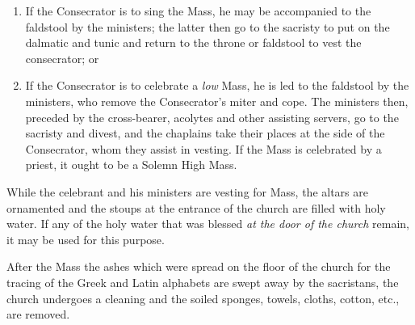 \documentclass[letterpaper]{report}
\begin{document}
{\begin{enumerate}
    \item If the Consecrator is to sing the Mass, he may be accompanied to the
        faldstool by the ministers; the latter then go to the sacristy to put
        on the dalmatic and tunic and return to the throne or faldstool to vest
        the consecrator; or

    \item If the Consecrator is to celebrate a \textit{low} Mass, he is led to
        the faldstool by the ministers, who remove the Consecrator's miter and
        cope. The ministers then, preceded by the cross-bearer, acolytes and
        other assisting servers, go to the sacristy and divest, and the
        chaplains take their places at the side of the Consecrator, whom they
        assist in vesting. If the Mass is celebrated by a priest, it ought to
        be a Solemn High Mass.
    
\end{enumerate}

\rubric While the celebrant and his ministers are vesting for Mass, the altars
are ornamented and the stoups at the entrance of the church are filled with
holy water. If any of the holy water that was blessed \textit{at the door of
the church} remain, it may be used for this purpose.

\rubric After the Mass the ashes which were spread on the floor of the church
for the tracing of the Greek and Latin alphabets are swept away by the
sacristans, the church undergoes a cleaning and the soiled sponges, towels,
cloths, cotton, etc., are removed.

}
\end{document}
